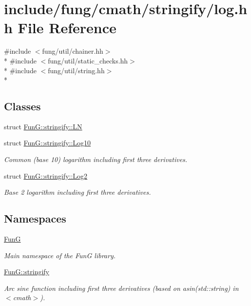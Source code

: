 \hypertarget{stringify_2log_8hh}{\section{include/fung/cmath/stringify/log.hh File Reference}
\label{stringify_2log_8hh}
}
{\ttfamily \#include $<$fung/util/chainer.\-hh$>$}\\*
{\ttfamily \#include $<$fung/util/static\-\_\-checks.\-hh$>$}\\*
{\ttfamily \#include $<$fung/util/string.\-hh$>$}\\*
\subsection*{Classes}
\begin{DoxyCompactItemize}
\item 
struct \hyperlink{structFunG_1_1stringify_1_1LN}{Fun\-G\-::stringify\-::\-L\-N}
\item 
struct \hyperlink{structFunG_1_1stringify_1_1Log10}{Fun\-G\-::stringify\-::\-Log10}
\begin{DoxyCompactList}\small\item\em Common (base 10) logarithm including first three derivatives. \end{DoxyCompactList}\item 
struct \hyperlink{structFunG_1_1stringify_1_1Log2}{Fun\-G\-::stringify\-::\-Log2}
\begin{DoxyCompactList}\small\item\em Base 2 logarithm including first three derivatives. \end{DoxyCompactList}\end{DoxyCompactItemize}
\subsection*{Namespaces}
\begin{DoxyCompactItemize}
\item 
\hyperlink{namespaceFunG}{Fun\-G}
\begin{DoxyCompactList}\small\item\em Main namespace of the Fun\-G library. \end{DoxyCompactList}\item 
\hyperlink{namespaceFunG_1_1stringify}{Fun\-G\-::stringify}
\begin{DoxyCompactList}\small\item\em Arc sine function including first three derivatives (based on asin(std\-::string) in $<$cmath$>$). \end{DoxyCompactList}\end{DoxyCompactItemize}
